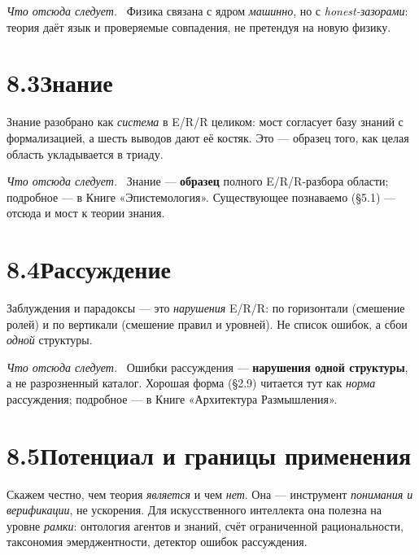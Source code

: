 \documentclass[12pt,a4paper]{article}
\newcommand{\rezultat}{\medskip\noindent\emph{Что отсюда следует.}\ }
\begin{document}
\rezultat
Физика связана с ядром \emph{машинно}, но с \emph{honest-зазорами}: теория даёт язык и проверяемые
совпадения, не претендуя на новую физику.

\section*{8.3\quad Знание}

Знание разобрано как \emph{система} в E/R/R целиком: мост согласует базу знаний с формализацией,
а шесть выводов дают её костяк. Это --- образец того, как целая область укладывается в триаду.

\rezultat
Знание --- \textbf{образец} полного E/R/R-разбора области; подробное --- в Книге «Эпистемология».
Существующее познаваемо (§5.1) --- отсюда и мост к теории знания.

\section*{8.4\quad Рассуждение}

Заблуждения и парадоксы --- это \emph{нарушения} E/R/R: по горизонтали (смешение ролей) и по
вертикали (смешение правил и уровней). Не список ошибок, а сбои \emph{одной} структуры.

\rezultat
Ошибки рассуждения --- \textbf{нарушения одной структуры}, а не разрозненный каталог. Хорошая форма
(§2.9) читается тут как \emph{норма} рассуждения; подробное --- в Книге «Архитектура Размышления».

\section*{8.5\quad Потенциал и границы применения}

Скажем честно, чем теория \emph{является} и чем \emph{нет}. Она --- инструмент \emph{понимания и
верификации}, не ускорения. Для искусственного интеллекта она полезна на уровне \emph{рамки}:
онтология агентов и знаний, счёт ограниченной рациональности, таксономия эмерджентности, детектор
ошибок рассуждения.
\end{document}
